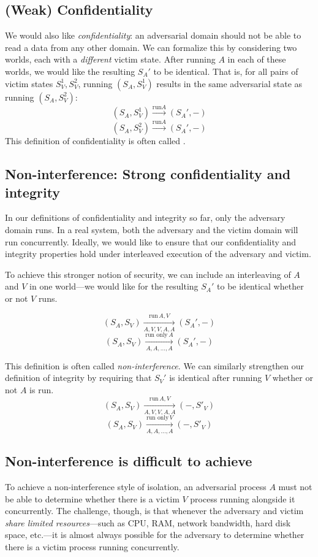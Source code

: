 \subsection{(Weak) Confidentiality}
We would also like \emph{confidentiality}: an adversarial domain should
not be able to read a data from any other domain.
We can formalize this by considering two worlds,
each with a \emph{different} victim state.
After running $A$ in each of these worlds, we would like
the resulting $S_A'$ to be identical.
That is, for all pairs of victim states $S_V^1, S_V^2$,
running $(S_A, S_V^1)$ results in the same adversarial
state as running $(S_A, S_V^2)$:
\[ (S_A, S_V^1) \xrightarrow{\text{run} A} (S_A', -) \]
\[ (S_A, S_V^2) \xrightarrow{\text{run} A} (S_A', -) \]
This definition of confidentiality is often called .

\subsection{Non-interference: Strong confidentiality and integrity}
In our definitions of confidentiality and integrity so far, 
only the adversary domain runs.
In a real system, both the adversary and the victim domain will run concurrently.
Ideally, we would like to ensure that our confidentiality and integrity
properties hold under interleaved execution of the adversary and victim.

To achieve this stronger notion of security, we
can include an interleaving of $A$ and $V$ in one
world---we would like for the resulting $S_A'$ to
be identical whether or not $V$ runs.

\[ (S_A, S_V) \xrightarrow[A, V, V, A, A]{\text{run}\, A, V} (S_A', -) \]
\[ (S_A, S_V) \xrightarrow[A, A, \ldots, A]{\text{run only}\, A} (S_A', -) \]

This definition is often called \emph{non-interference}. We can similarly strengthen our definition of integrity by requiring that $S_V'$ is identical after running $V$ whether or not $A$ is run.
\[ (S_A, S_V) \xrightarrow[A, V, V, A, A]{\text{run}\, A, V} (-, S'_V) \]
\[ (S_A, S_V) \xrightarrow[A, A, \ldots, A]{\text{run only}\, V} (-, S'_V) \]

\subsection{Non-interference is difficult to achieve}

To achieve a non-interference style of isolation, 
an adversarial process $A$ must not be able to 
determine whether there is a victim $V$ process running
alongside it concurrently.
The challenge, though, is that whenever the adversary
and victim \emph{share limited resources}---such as CPU, RAM,
network bandwidth, hard disk space, etc.---it is almost
always possible for the adversary to determine whether
there is a victim process running concurrently.

